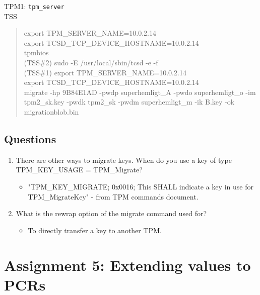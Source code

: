 \documentclass[10pt]{article}
\newcommand{\command}[1]{\texttt{#1}}
\begin{document}
TPM1:  \command{tpm\_server } \\

TSS \\
\begin{quote}
export TPM\_SERVER\_NAME=10.0.2.14 \\
export TCSD\_TCP\_DEVICE\_HOSTNAME=10.0.2.14 \\
tpmbios \\
(TSS\#2) sudo -E /usr/local/sbin/tcsd -e -f \\

(TSS\#1) export TPM\_SERVER\_NAME=10.0.2.14 \\
export TCSD\_TCP\_DEVICE\_HOSTNAME=10.0.2.14 \\
    
migrate -hp 9B84E1AD -pwdp superhemligt\_A -pwdo superhemligt\_o -im tpm2\_sk.key -pwdk tpm2\_sk -pwdm superhemligt\_m -ik B.key -ok migrationblob.bin
\end{quote}

\subsection{Questions}
\begin{enumerate}
    \item {There are other ways to migrate keys. When do you use a key of type TPM\_KEY\_USAGE = TPM\_Migrate? }
	\begin{itemize}
	    \item {"TPM\_KEY\_MIGRATE; 0x0016; This SHALL indicate a key in use for TPM\_MigrateKey" - from TPM commands document.}
	\end{itemize}
    \item {What is the rewrap option of the migrate command used for? }
	\begin{itemize}
	    \item {To directly transfer a key to another TPM.}
	\end{itemize}
\end{enumerate}




\section{Assignment 5: Extending values to PCRs}
\end{document}
